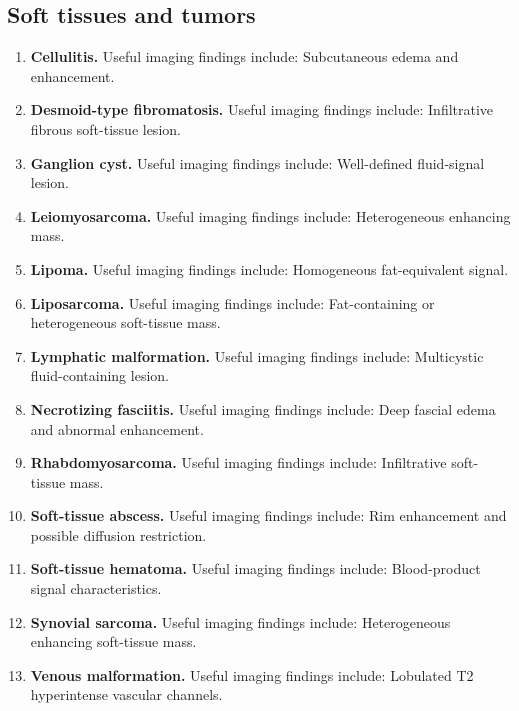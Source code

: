 \subsection{Soft tissues and tumors}
\begin{enumerate}[leftmargin=*,itemsep=0.45em,topsep=0.4em]
\item \textbf{Cellulitis.} Useful imaging findings include: Subcutaneous edema and enhancement.
\item \textbf{Desmoid-type fibromatosis.} Useful imaging findings include: Infiltrative fibrous soft-tissue lesion.
\item \textbf{Ganglion cyst.} Useful imaging findings include: Well-defined fluid-signal lesion.
\item \textbf{Leiomyosarcoma.} Useful imaging findings include: Heterogeneous enhancing mass.
\item \textbf{Lipoma.} Useful imaging findings include: Homogeneous fat-equivalent signal.
\item \textbf{Liposarcoma.} Useful imaging findings include: Fat-containing or heterogeneous soft-tissue mass.
\item \textbf{Lymphatic malformation.} Useful imaging findings include: Multicystic fluid-containing lesion.
\item \textbf{Necrotizing fasciitis.} Useful imaging findings include: Deep fascial edema and abnormal enhancement.
\item \textbf{Rhabdomyosarcoma.} Useful imaging findings include: Infiltrative soft-tissue mass.
\item \textbf{Soft-tissue abscess.} Useful imaging findings include: Rim enhancement and possible diffusion restriction.
\item \textbf{Soft-tissue hematoma.} Useful imaging findings include: Blood-product signal characteristics.
\item \textbf{Synovial sarcoma.} Useful imaging findings include: Heterogeneous enhancing soft-tissue mass.
\item \textbf{Venous malformation.} Useful imaging findings include: Lobulated T2 hyperintense vascular channels.
\end{enumerate}

